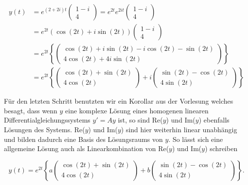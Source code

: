 \begin{solution}
    \begin{equation*}
        \begin{aligned}
            y(t) &= e^{(2+2i)t} \begin{pmatrix}
                1-i \\ 4
            \end{pmatrix} =
            e^{2t} e^{2it} \begin{pmatrix}
                1-i \\ 4
            \end{pmatrix} \\[0.5em]
            &= e^{2t} \left( \cos(2t) + i \sin(2t) \right) \begin{pmatrix}
                1-i \\ 4
            \end{pmatrix} \\[0.5em]
            &= e^{2t} \left\{ \begin{pmatrix}
                \cos(2t) + i \sin(2t) - i \cos(2t) - \sin(2t) \\
                4 \cos(2t) + 4i \sin(2t)
            \end{pmatrix} \right\} \\[0.5em]
            &= e^{2t} \left\{ \begin{pmatrix}
                \cos(2t) + \sin(2t) \\
                4 \cos(2t)
            \end{pmatrix} + i \begin{pmatrix}
                \sin(2t) - \cos(2t) \\
                4 \sin(2t)
            \end{pmatrix} \right\} 
        \end{aligned}
    \end{equation*}

    \vspace{0.5\baselineskip}

    Für den letzten Schritt benutzten wir ein Korollar aus der Vorlesung welches besagt, dass wenn \( y \) eine komplexe Lösung eines homogenen linearen Differentialgleichungssystems \( y'=Ay \) ist, so sind Re(\(y\)) und Im(\(y\)) ebenfalls Lösungen des Systems. Re(\(y\)) und Im(\(y\)) sind hier weiterhin linear unabhängig und bilden dadurch eine Basis des Lösungsraums von \( y \). So lässt sich eine allgemeine Lösung auch als Linearkombination von Re(\(y\)) und Im(\(y\)) schreiben

    \begin{equation*}
        y(t) = e^{2t} \left\{ a \begin{pmatrix}
            \cos(2t) + \sin(2t) \\
            4 \cos(2t)
        \end{pmatrix} + b \begin{pmatrix}
            \sin(2t) - \cos(2t) \\
            4 \sin(2t)
        \end{pmatrix} \right\}.
    \end{equation*}


\end{solution}
